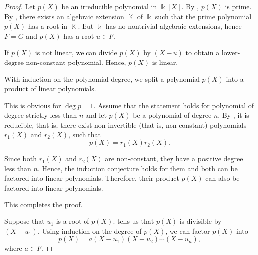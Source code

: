 \begin{proof}
   Let \( p(X) \) be an irreducible polynomial in \( \Bbbk[X] \). By , \( p(X) \) is prime. By , there exists an algebraic extension \( \BbbK \) of \( \Bbbk \) such that the prime polynomial \( p(X) \) has a root in \( \BbbK \). But \( \Bbbk \) has no nontrivial algebraic extensions, hence \( F = G \) and \( p(X) \) has a root \( u \in F \).

  If \( p(X) \) is not linear, we can divide \( p(X) \) by \( (X - u) \) to obtain a lower-degree non-constant polynomial. Hence, \( p(X) \) is linear.

   With induction on the polynomial degree, we split a polynomial \( p(X) \) into a product of linear polynomials.

  This is obvious for \( \deg p = 1 \). Assume that the statement holds for polynomial of degree strictly less than \( n \) and let \( p(X) \) be a polynomial of degree \( n \). By , it is \hyperref[def:irreducible_ring_element]{reducible}, that is, there exist non-invertible (that is, non-constant) polynomials \( r_1(X) \) and \( r_2(X) \), such that
  \begin{equation*}
    p(X) = r_1(X) r_2(X).
  \end{equation*}

  Since both \( r_1(X) \) and \( r_2(X) \) are non-constant, they have a positive degree less than \( n \). Hence, the induction conjecture holds for them and both can be factored into linear polynomials. Therefore, their product \( p(X) \) can also be factored into linear polynomials.

  This completes the proof.

   Suppose that \( u_1 \) is a root of \( p(X) \).  tells us that \( p(X) \) is divisible by \( (X - u_1) \). Using induction on the degree of \( p(X) \), we can factor \( p(X) \) into
  \begin{equation*}
    p(X) = a (X - u_1) (X - u_2) \cdots (X - u_n),
  \end{equation*}
  where \( a \in F \).


\end{proof}
